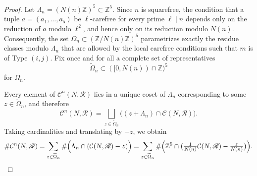 \documentclass[table]{amsart}
\numberwithin{equation}{section}
\begin{document}
\begin{proof}
Let $\Lambda_n=(N(n)\mathbb{Z})^5\subset\mathbb{Z}^5$. Since $n$ is squarefree,
the condition that a tuple $a=(a_1,\dots,a_5)$ be $\ell$-carefree for every
prime $\ell\mid n$ depends only on the reduction of $a$ modulo $\ell^2$, and
hence only on its reduction modulo $N(n)$. Consequently, the set
$\Omega_n\subset(\mathbb{Z}/N(n)\mathbb{Z})^5$ parametrizes exactly the residue
classes modulo $\Lambda_n$ that are allowed by the local carefree conditions such that $m$ is of Type $(i,j)$.
Fix once and for all a complete set of representatives
\[
\widetilde{\Omega}_n\subset ([0,N(n))\cap\mathbb{Z})^5
\]
for $\Omega_n$.

Every element of $\mathcal{C}^n(N,\mathscr{R})$ lies in a unique coset of $\Lambda_n$
corresponding to some $z\in\widetilde{\Omega}_n$, and therefore
\[
\mathcal{C}^n(N,\mathscr{R})
=
\bigsqcup_{z\in\widetilde{\Omega}_n}
\bigl((z+\Lambda_n)\cap\mathcal{C}(N,\mathscr{R})\bigr).
\]
Taking cardinalities and translating by $-z$, we obtain
\[
\#\mathcal{C}^n(N,\mathscr{R})
=
\sum_{z\in\widetilde{\Omega}_n}
\#\Bigl(\Lambda_n\cap(\mathcal{C}(N,\mathscr{R})-z)\Bigr)
=
\sum_{z\in\widetilde{\Omega}_n}
\#\Bigl(\mathbb{Z}^5\cap\bigl(\tfrac{1}{N(n)}\mathcal{C}(N,\mathscr{R})-\tfrac{z}{N(n)}\bigr)\Bigr).
\]


\end{proof}
\end{document}
